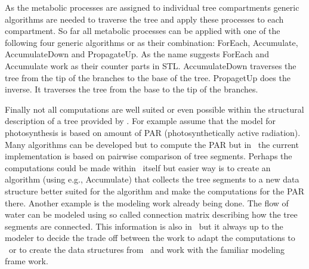 As   the  metabolic  processes   are   assigned   to   individual tree
compartments  generic algorithms are  needed to traverse  the tree and
apply these processes   to each  compartment.   So far   all metabolic
processes can  be  applied with  one  of  the following   four generic
algorithms   or   as     their   combination:   ForEach,   Accumulate,
AccumulateDown  and PropagateUp.   As the  name   suggests ForEach and
Accumulate work   as  their counter  parts   in  STL.   AccumulateDown
traverses  the tree from the  tip of the branches to   the base of the
tree. PropagetUp does the inverse. It traverses the tree from the base
to the tip of the branches.

Finally  not all computations are well  suited or even possible within
the structural description of a  tree provided by \lignum. For example
assume that  the model  for photosynthesis is  based  on amount of PAR
(photosynthetically   active  radiation).     Many   algorithms can be
developed but to compute   the   PAR  but  in \lignum\  the    current
implementation   is based on   pairwise  comparison of tree  segments.
Perhaps  the  computations could  be  made within  \lignum\ itself but
easier way  is to create  an algorithm  (using  e.g., Accumulate) that
collects the tree  segments to a  new data structure better suited for
the algorithm and  make the computations  for the PAR there.   Another
example is the modeling work already being done. The flow of water can
be modeled  using so called  connection matrix describing how the tree
segments  are connected. This information  is  also in \lignum\ but it
always up to the  modeler to decide the  trade off between the work to
adapt the  computations to \lignum\ or  to create the  data structures
from \lignum\ and work with the familiar modeling frame work.
